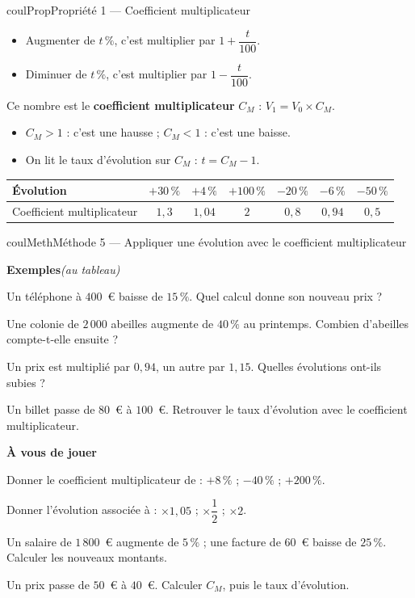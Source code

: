 \documentclass[11pt,a4paper]{article}
\makeatletter
\newcounter{lycee@signet}
\newcommand{\signet}[3][]{\stepcounter{lycee@signet}%
  \edef\lycee@dest{\if\relax\detokenize{#1}\relax
    signet.\arabic{lycee@signet}\else#1\fi}%
  \hypertarget{\lycee@dest}{}\bookmark[level=#2,dest=\lycee@dest]{#3}}
\newcounter{methode}
\newenvironment{proprietebox}[1][Propriété]%
  {\begin{boitecours}[phantom={\signet{2}{#1}}]{coulProp}{#1}}{\end{boitecours}}
\newenvironment{methodebox}[1][Méthode]{\stepcounter{methode}%
  \begin{boitecours}[phantom={\signet[methode-\arabic{methode}]{2}{#1}}]{coulMeth}{#1}}%
  {\end{boitecours}}
\newcommand{\etape}[1]{\par\smallskip\textbf{\color{coulMeth}#1}\par\nobreak\smallskip}
\newcommand{\autableau}{\hfill{\footnotesize\itshape\color{black!45}(au tableau)}}
\newcommand{\etapeexemples}{%
    \par\smallskip\textbf{\color{coulMeth}Exemples}\autableau\par\nobreak\smallskip}
\makeatother
\begin{document}
\begin{proprietebox}[Propriété 1 --- Coefficient multiplicateur]
\begin{itemize}
  \item Augmenter de $t\,\%$, c'est multiplier par $\boxed{1+\dfrac{t}{100}}$.
  \item Diminuer de $t\,\%$, c'est multiplier par $\boxed{1-\dfrac{t}{100}}$.
\end{itemize}
Ce nombre est le \textbf{coefficient multiplicateur} $C_{M}$ : $V_{1}=V_{0}\times C_{M}$.
\begin{itemize}
  \item $C_{M}>1$ : c'est une hausse ; $C_{M}<1$ : c'est une baisse.
  \item On lit le taux d'évolution sur $C_{M}$ : $t=C_{M}-1$.
\end{itemize}
\end{proprietebox}

\begin{center}
\renewcommand{\arraystretch}{1.4}
\begin{tabular}{|l|c|c|c|c|c|c|}
\hline
Évolution & $+30\,\%$ & $+4\,\%$ & $+100\,\%$ & $-20\,\%$ & $-6\,\%$ & $-50\,\%$\\
\hline
Coefficient multiplicateur & $1{,}3$ & $1{,}04$ & $2$ & $0{,}8$ & $0{,}94$ & $0{,}5$\\
\hline
\end{tabular}
\end{center}

\begin{methodebox}[Méthode 5 --- Appliquer une évolution avec le coefficient multiplicateur]
\etapeexemples
\begin{questions}[label=\alph*)]
  \item Un téléphone à $400$~€ baisse de $15\,\%$. Quel calcul donne son nouveau prix ?
  \item Une colonie de $2\,000$ abeilles augmente de $40\,\%$ au printemps. Combien
        d'abeilles compte-t-elle ensuite ?
  \item Un prix est multiplié par $0{,}94$, un autre par $1{,}15$. Quelles évolutions
        ont-ils subies ?
  \item Un billet passe de $80$~€ à $100$~€. Retrouver le taux d'évolution avec le
        coefficient multiplicateur.
\end{questions}

\etape{À vous de jouer}
\begin{questions}
  \item Donner le coefficient multiplicateur de : $+8\,\%$ ; $-40\,\%$ ; $+200\,\%$.
  \item Donner l'évolution associée à : $\times 1{,}05$ ; $\times\dfrac{1}{2}$ ;
        $\times 2$.
  \item Un salaire de $1\,800$~€ augmente de $5\,\%$ ; une facture de $60$~€ baisse de
        $25\,\%$. Calculer les nouveaux montants.
  \item Un prix passe de $50$~€ à $40$~€. Calculer $C_{M}$, puis le taux d'évolution.
\end{questions}

\end{methodebox}
\end{document}
